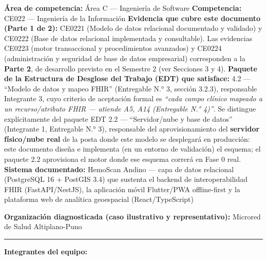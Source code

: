 \documentclass[11pt,a4paper]{article}
\begin{document}
\textbf{Área de competencia:} Área C --- Ingeniería de Software
\textbf{Competencia:} CE022 --- Ingeniería de la Información
\textbf{Evidencia que cubre este documento (Parte 1 de 2):} CE0221 (Modelo de datos relacional documentado y validado) y CE0222 (Base de datos relacional implementada y consultable). Las evidencias CE0223 (motor transaccional y procedimientos avanzados) y CE0224 (administración y seguridad de base de datos empresarial) corresponden a la \textbf{Parte 2}, de desarrollo previsto en el Semestre 2 (ver Secciones 3 y 4).
\textbf{Paquete de la Estructura de Desglose del Trabajo (EDT) que satisface:} 4.2 --- ``Modelo de datos y mapeo FHIR'' (Entregable N.° 3, sección 3.2.3), responsable Integrante 3, cuyo criterio de aceptación formal es \emph{``cada campo clínico mapeado a un recurso/atributo FHIR --- atiende A5, A14 (Entregable N.° 4)''}. Se distingue explícitamente del paquete EDT 2.2 --- ``Servidor/nube y base de datos'' (Integrante 1, Entregable N.° 3), responsable del aprovisionamiento del \textbf{servidor físico/nube real} de la posta donde este modelo se desplegará en producción: este documento diseña e implementa (en un entorno de validación) el esquema; el paquete 2.2 aprovisiona el motor donde ese esquema correrá en Fase 0 real.
\textbf{Sistema documentado:} HemoScan Andino --- capa de datos relacional (PostgreSQL 16 + PostGIS 3.4) que sustenta el backend de interoperabilidad FHIR (FastAPI/NestJS), la aplicación móvil Flutter/PWA offline-first y la plataforma web de analítica geoespacial (React/TypeScript)

\textbf{Organización diagnosticada (caso ilustrativo y representativo):} Microred de Salud Altiplano-Puno

\begin{center}\rule{0.5\linewidth}{0.5pt}\end{center}

\textbf{Integrantes del equipo:}
\end{document}
